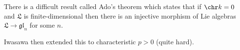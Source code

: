 There is a difficult result called Ado's theorem which states that
if $\chr k = 0$ and $\mathfrak{L}$ is finite-dimensional then there is an
injective morphism of Lie algebras $\mathfrak{L}\to \mathfrak{gl}_n$ for some
$n$.

Iwasawa then extended this to characteristic $p > 0$ (quite hard).
